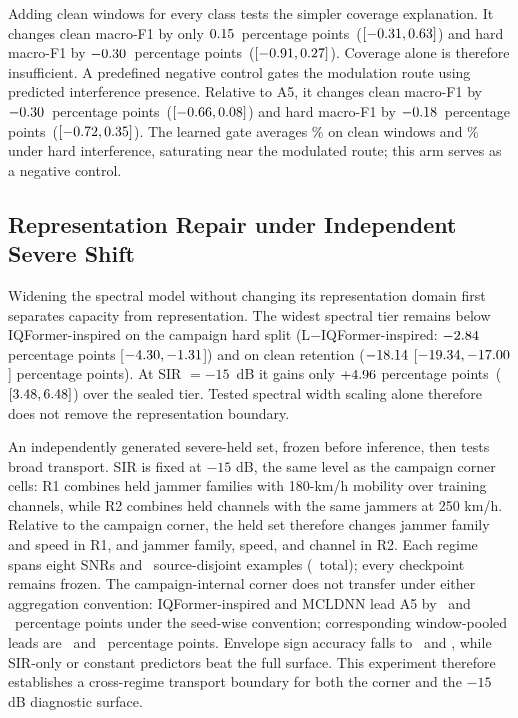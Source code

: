 \documentclass[letterpaper,journal]{IEEEtran}
\newcommand{\pp}{percentage points}
\begin{document}
Adding clean windows for every class tests the simpler coverage explanation.
It changes clean macro-F1 by only $0.15$\ \pp\
($[-0.31,0.63]$) and hard macro-F1 by
$-0.30$\ \pp\ ($[-0.91,0.27]$). Coverage
alone is therefore insufficient. A predefined negative control gates the
modulation route using predicted interference presence. Relative to A5, it
changes clean macro-F1 by $-0.30$\ \pp\
($[-0.66,0.08]$) and hard
macro-F1 by $-0.18$\ \pp\
($[-0.72,0.35]$). The learned
gate averages \PresenceGateCleanMean\% on clean windows and
\PresenceGateHardMean\% under hard interference, saturating near the modulated
route; this arm serves as a negative control.

\subsection{Representation Repair under Independent Severe Shift}
Widening the spectral model without changing its representation domain first
separates capacity from representation. The widest spectral tier remains below
IQFormer-inspired on the campaign hard split (L$-$IQFormer-inspired:
$-2.84$ percentage points
[$-4.30,-1.31$]) and on clean
retention ($-18.14$
[$-19.34,-17.00$] percentage
points). At SIR $=-15$~dB it gains only $+4.96$ \pp\
($[3.48,6.48]$) over the sealed tier.
Tested spectral width scaling alone therefore does not remove the
representation boundary.

An independently generated severe-held set, frozen before inference, then
tests broad transport. SIR is fixed at $-15$ dB, the same level as the
campaign corner cells: R1 combines held jammer families with 180-km/h
mobility over training channels, while R2 combines held channels with the
same jammers at 250 km/h. Relative to the campaign corner, the held set
therefore changes jammer family and speed in R1, and jammer family, speed,
and channel in R2. Each regime spans eight SNRs and
\SevereHeldSourcesPerRegime\ \mbox{source-disjoint} examples
(\SevereHeldSourcesTotal\ total); every checkpoint remains frozen. The
campaign-internal corner does not transfer under either aggregation
convention: IQFormer-inspired and MCLDNN lead A5 by
\SevereReferenceLeadIqformer\ and \SevereReferenceLeadMcldnn\ percentage points
under the seed-wise convention; corresponding window-pooled leads are
\SevereTransferLeadIqformer\ and \SevereTransferLeadMcldnn\ percentage points.
Envelope sign accuracy falls
to \SevereTransferSignAccIqformer\ and \SevereTransferSignAccMcldnn, while
SIR-only or constant predictors beat the full surface. This experiment
therefore establishes a cross-regime transport boundary for both the corner
and the $-15$ dB diagnostic surface.
\end{document}
